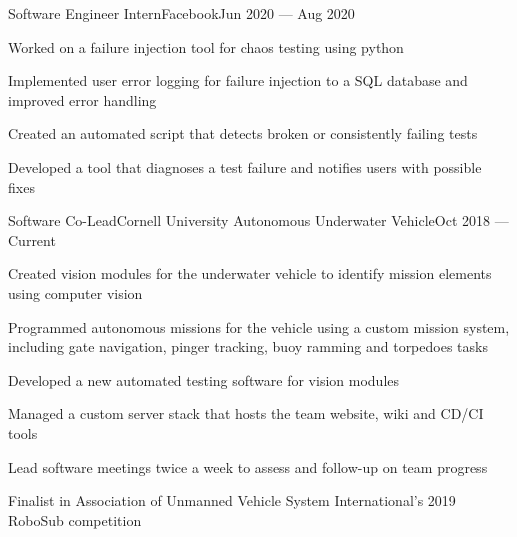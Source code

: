 \documentclass{resume}
\begin{document}
\begin{experience}
    \begin{entry}{Software Engineer Intern}{Facebook}{Jun 2020 --- Aug 2020}
        \begin{description}
            \item Worked on a failure injection tool for chaos testing using
                python
            \item Implemented user error logging for failure injection to a SQL
                database and improved error handling
            \item Created an automated script that detects broken or consistently
                failing tests
            \item Developed a tool that diagnoses a test failure and notifies
                users with possible fixes
        \end{description}
    \end{entry}

    \begin{entry}{Software Co-Lead}{Cornell University Autonomous Underwater
        Vehicle}{Oct 2018 --- Current}
        \begin{description}
            \item Created vision modules for the underwater vehicle to identify
                mission elements using computer vision
            \item Programmed autonomous missions for the vehicle using a custom
                mission system, including gate navigation, pinger tracking, buoy
                ramming and torpedoes tasks
            \item Developed a new automated testing software for vision modules
            \item Managed a custom server stack that hosts the team website,
                wiki and CD/CI tools
            \item Lead software meetings twice a week to assess and follow-up on
                team progress
            \item Finalist in Association of Unmanned Vehicle System
                International's 2019 RoboSub competition
        \end{description}
    \end{entry}



\end{experience}
\end{document}
